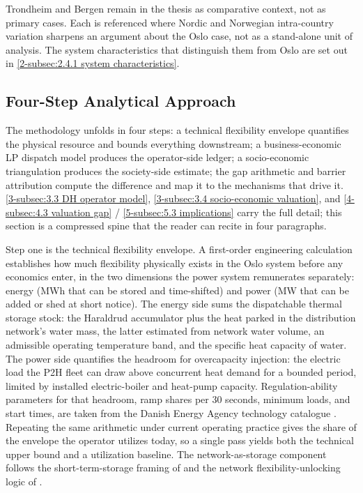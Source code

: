 
Trondheim and Bergen remain in the thesis as comparative context, not as primary cases. Each is referenced where Nordic and Norwegian intra-country variation sharpens an argument about the Oslo case, not as a stand-alone unit of analysis. The system characteristics that distinguish them from Oslo are set out in \autoref{2-subsec:2.4.1 system characteristics}.


\subsection{Four-Step Analytical Approach}
\label{3-subsec:3.2 analytical approach}

The methodology unfolds in four steps: a technical flexibility envelope quantifies the physical resource and bounds everything downstream; a business-economic LP dispatch model produces the operator-side ledger; a socio-economic triangulation produces the society-side estimate; the gap arithmetic and barrier attribution compute the difference and map it to the mechanisms that drive it. \autoref{3-subsec:3.3 DH operator model}, \autoref{3-subsec:3.4 socio-economic valuation}, and \autoref{4-subsec:4.3 valuation gap} / \autoref{5-subsec:5.3 implications} carry the full detail; this section is a compressed spine that the reader can recite in four paragraphs.

Step one is the technical flexibility envelope. A first-order engineering calculation establishes how much flexibility physically exists in the Oslo system before any economics enter, in the two dimensions the power system remunerates separately: energy (MWh that can be stored and time-shifted) and power (MW that can be added or shed at short notice). The energy side sums the dispatchable thermal storage stock: the Haraldrud accumulator plus the heat parked in the distribution network's water mass, the latter estimated from network water volume, an admissible operating temperature band, and the specific heat capacity of water. The power side quantifies the headroom for overcapacity injection: the electric load the P2H fleet can draw above concurrent heat demand for a bounded period, limited by installed electric-boiler and heat-pump capacity. Regulation-ability parameters for that headroom, ramp shares per 30 seconds, minimum loads, and start times, are taken from the Danish Energy Agency technology catalogue \cite{danish_energy_agency_technology_2024}. Repeating the same arithmetic under current operating practice gives the share of the envelope the operator utilizes today, so a single pass yields both the technical upper bound and a utilization baseline. The network-as-storage component follows the short-term-storage framing of \cite{hennessy_flexibility_2019} and the network flexibility-unlocking logic of \cite{vandermeulen_controlling_2018}.

